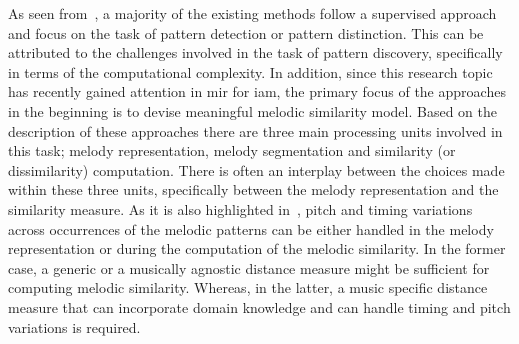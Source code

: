 As seen from~, a majority of the existing methods follow a supervised approach and focus on the task of pattern detection or pattern distinction. This can be attributed to the challenges involved in the task of pattern discovery, specifically in terms of the computational complexity. In addition, since this research topic has recently gained attention in \gls{mir} for \gls{iam}, the primary focus of the approaches in the beginning is to devise meaningful melodic similarity model. Based on the description of these approaches there are three main processing units involved in this task; melody representation, melody segmentation and similarity (or dissimilarity) computation. There is often an interplay between the choices made within these three units, specifically between the melody representation and the similarity measure. As it is also highlighted in~\cite{gomez2003melody}, pitch and timing variations across occurrences of the melodic patterns can be either handled in the melody representation or during the computation of the melodic similarity. In the former case, a generic or a musically agnostic distance measure might be sufficient for computing melodic similarity. Whereas, in the latter, a music specific distance measure that can incorporate domain knowledge and can handle timing and pitch variations is required. 

